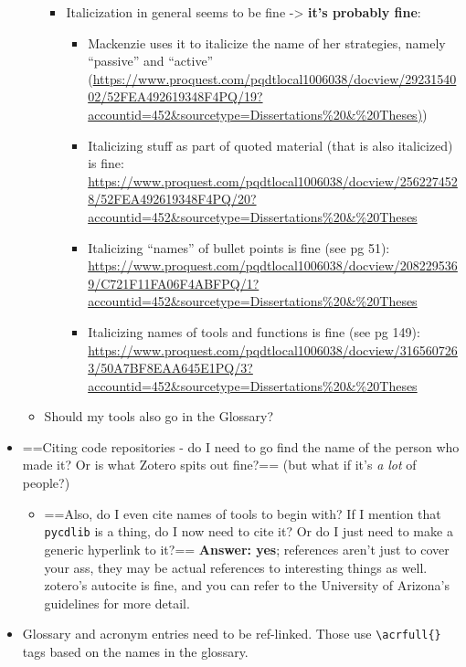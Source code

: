 \begin{itemize}
\begin{itemize}
    \begin{itemize}
    \tightlist
    \item
      Italicization in general seems to be fine -\textgreater{}
      \textbf{it's probably fine}:

      \begin{itemize}
      \tightlist
      \item
        Mackenzie uses it to italicize the name of her strategies,
        namely ``passive'' and ``active''
        (\href{https://www.proquest.com/pqdtlocal1006038/docview/2923154002/52FEA492619348F4PQ/19?accountid=452&sourcetype=Dissertations\%20&\%20Theses}{https://www.proquest.com/pqdtlocal1006038/docview/2923154002/52FEA492619348F4PQ/19?accountid=452\&sourcetype=Dissertations\%20\&\%20Theses)})
      \item
        Italicizing stuff as part of quoted material (that is also
        italicized) is fine:
        \url{https://www.proquest.com/pqdtlocal1006038/docview/2562274528/52FEA492619348F4PQ/20?accountid=452&sourcetype=Dissertations\%20&\%20Theses}
      \item
        Italicizing ``names'' of bullet points is fine (see pg 51):
        \url{https://www.proquest.com/pqdtlocal1006038/docview/2082295369/C721F11FA06F4ABFPQ/1?accountid=452&sourcetype=Dissertations\%20&\%20Theses}
      \item
        Italicizing names of tools and functions is fine (see pg 149):
        \url{https://www.proquest.com/pqdtlocal1006038/docview/3165607263/50A7BF8EAA645E1PQ/3?accountid=452&sourcetype=Dissertations\%20&\%20Theses}
      \end{itemize}
    \end{itemize}
  \item
    Should my tools also go in the Glossary?
  \end{itemize}
\item
  ==Citing code repositories - do I need to go find the name of the
  person who made it? Or is what Zotero spits out fine?== (but what if
  it's \emph{a lot} of people?)

  \begin{itemize}
  \tightlist
  \item
    ==Also, do I even cite names of tools to begin with? If I mention
    that \passthrough{\lstinline!pycdlib!} is a thing, do I now need to
    cite it? Or do I just need to make a generic hyperlink to it?==
    \textbf{Answer: yes}; references aren't just to cover your ass, they
    may be actual references to interesting things as well. zotero's
    autocite is fine, and you can refer to the University of Arizona's
    guidelines for more detail.
  \end{itemize}
\item
  Glossary and acronym entries need to be ref-linked. Those use
  \passthrough{\lstinline!\\acrfull\{\}!} tags based on the names in the
  glossary.


\end{itemize}
